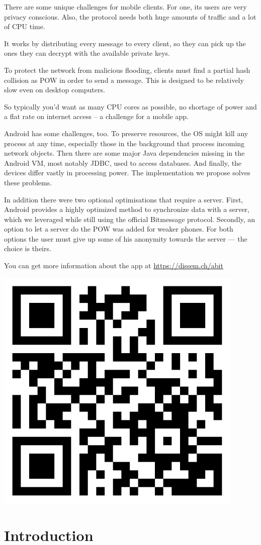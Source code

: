 \documentclass{bfh}
\begin{document}
  There are some unique challenges for mobile clients. For one, its users are very privacy conscious. Also, the protocol needs both huge amounts of traffic and a lot of \acs{CPU} time.

  It works by distributing every message to every client, so they can pick up the ones they can decrypt with the available private keys.

  To protect the network from malicious flooding, clients must find a partial hash collision as \acl{POW} in order to send a message. This is designed to be relatively slow even on desktop computers.

  So typically you'd want as many \acs{CPU} cores as possible, no shortage of power and a flat rate on internet access – a challenge for a mobile app.

  Android\texttrademark{} has some challenges, too. To preserve resources, the \acl{OS} might kill any process at any time, especially those in the background that process incoming network objects. Then there are some major Java dependencies missing in the Android \acs{VM}, most notably \acs{JDBC}, used to access databases. And finally, the devices differ vastly in processing power. The implementation we propose solves these problems.

  In addition there were two optional optimisations that require a server. First, Android provides a highly optimized method to synchronize data with a server, which we leveraged while still using the official Bitmessage protocol. Secondly, an option to let a server do the \acl{POW} was added for weaker phones. For both options the user must give up some of his anonymity towards the server --- the choice is theirs.

  You can get more information about the app at \url{https://dissem.ch/abit}

  \begin{center}
    \includegraphics[width=0.2 \textwidth]{images/QR_abit_webpage.pdf}
  \end{center}


  \newpage
  \tableofcontents


  \newpage
  \section{Introduction}
\end{document}
